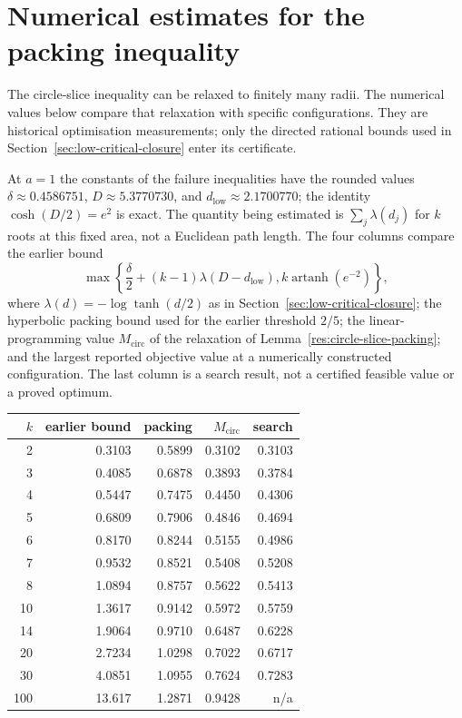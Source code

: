 \appendix

\section{Numerical estimates for the packing inequality}
\label{sec:record-circle-slice}

The circle-slice inequality can be relaxed to finitely many radii.
The numerical values below compare that relaxation with specific
configurations. They are historical optimisation measurements; only
the directed rational bounds used in
Section~\ref{sec:low-critical-closure} enter its certificate.

At $a=1$ the constants of the failure inequalities have the rounded
values $\delta\approx0.4586751$, $D\approx5.3770730$, and
$d_{\mathrm{low}}\approx2.1700770$; the identity $\cosh(D/2)=e^{2}$ is exact. The quantity being estimated is
$\sum_j\lambda(d_j)$ for $k$ roots at this fixed area, not a Euclidean
path length. The four columns compare the earlier bound
\[
 \max\!\left\{\frac\delta2+(k-1)\lambda(D-d_{\mathrm{low}}),
                  k\operatorname{artanh}(e^{-2})\right\},
\]
where $\lambda(d)=-\log\tanh(d/2)$ as in
Section~\ref{sec:low-critical-closure}; the hyperbolic packing bound used
for the earlier threshold $2/5$; the linear-programming value
$M_{\mathrm{circ}}$ of the relaxation of
Lemma~\ref{res:circle-slice-packing}; and the largest reported objective
value at a numerically constructed configuration. The last column is a
search result, not a certified feasible value or a proved optimum.

\begin{center}
\begin{tabular}{@{}rrrrr@{}}
\toprule
$k$ & earlier bound & packing & $M_{\mathrm{circ}}$ & search \\
\midrule
2 & 0.3103 & 0.5899 & 0.3102 & 0.3103 \\
3 & 0.4085 & 0.6878 & 0.3893 & 0.3784 \\
4 & 0.5447 & 0.7475 & 0.4450 & 0.4306 \\
5 & 0.6809 & 0.7906 & 0.4846 & 0.4694 \\
6 & 0.8170 & 0.8244 & 0.5155 & 0.4986 \\
7 & 0.9532 & 0.8521 & 0.5408 & 0.5208 \\
8 & 1.0894 & 0.8757 & 0.5622 & 0.5413 \\
10 & 1.3617 & 0.9142 & 0.5972 & 0.5759 \\
14 & 1.9064 & 0.9710 & 0.6487 & 0.6228 \\
20 & 2.7234 & 1.0298 & 0.7022 & 0.6717 \\
30 & 4.0851 & 1.0955 & 0.7624 & 0.7283 \\
100 & 13.617 & 1.2871 & 0.9428 & n/a \\
\bottomrule
\end{tabular}
\end{center}

